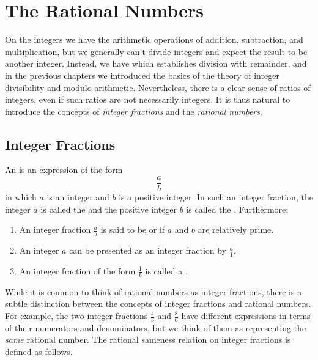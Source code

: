 \chapter{The Rational Numbers}

On the integers we have the arithmetic operations of addition, subtraction, and multiplication, but we generally can't divide integers and expect the result to be another integer. Instead, we have  which establishes division with remainder, and in the previous chapters we introduced the basics of the theory of integer divisibility and modulo arithmetic. Nevertheless, there is a clear sense of ratios of integers, even if such ratios are not necessarily integers. It is thus natural to introduce the concepts of \emph{integer fractions} and the \emph{rational numbers}.

\section{Integer Fractions}

\begin{definition}
  An  is an expression of the form
  \begin{equation*}
    \frac{a}{b}
  \end{equation*}
  in which $a$ is an integer and $b$ is a positive integer. In such an integer fraction, the integer $a$ is called the  and the positive integer $b$ is called the . Furthermore:
  \begin{enumerate}
  \item An integer fraction $\frac{a}{b}$ is said to be  or  if $a$ and $b$ are relatively prime.
  \item An integer $a$ can be presented as an integer fraction by $\frac{a}{1}$.
  \item An integer fraction of the form $\frac{1}{b}$ is called a .
  \end{enumerate}
\end{definition}

While it is common to think of rational numbers as integer fractions, there is a subtle distinction between the concepts of integer fractions and rational numbers. For example, the two integer fractions $\frac{4}{3}$ and $\frac{8}{6}$ have different expressions in terms of their numerators and denominators, but we think of them as representing the \emph{same} rational number. The rational sameness relation on integer fractions is defined as follows.


